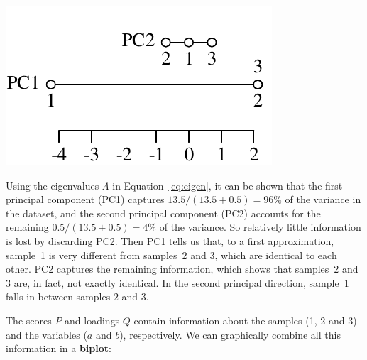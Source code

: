 \noindent\begin{minipage}[t][][b]{.27\textwidth}
  \includegraphics[width=\textwidth]{../figures/PCA2D2.pdf}\medskip
\end{minipage}
\begin{minipage}[t][][t]{.73\textwidth}
  \label{fig:PCA2D2}
\end{minipage}

Using the eigenvalues $\Lambda$ in Equation~\ref{eq:eigen}, it can be
shown that the first principal component (PC1) captures
$13.5/(13.5+0.5)=96\%$ of the variance in the dataset, and the second
principal component (PC2) accounts for the remaining
$0.5/(13.5+0.5)=4\%$ of the variance. So relatively little information
is lost by discarding PC2. Then PC1 tells us that, to a first
approximation, sample~1 is very different from samples~2 and 3, which
are identical to each other. PC2 captures the remaining information,
which shows that samples~2 and 3 are, in fact, not exactly
identical. In the second principal direction, sample~1 falls in
between samples $2$ and $3$.\medskip

The scores $P$ and loadings $Q$ contain information about the samples
(1, 2 and 3) and the variables ($a$ and $b$), respectively.  We can
graphically combine all this information in a \textbf{biplot}:

